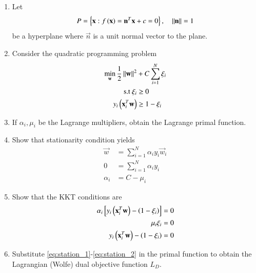 \documentclass[journal,12pt,twocolumn]{IEEEtran}
\renewcommand\thesection{\arabic{section}}
\begin{document}
\begin{enumerate}[label=\thesection.\arabic*,ref=\thesection.\theenumi]
\item Let 
\begin{align}
P = \left\{\mathbf{x}:f\left(\mathbf{x}\right)=\mathbf{n}^T\mathbf{x} +c = 0\right\}, \quad \left\Vert\mathbf{n}\right\Vert = 1
\end{align}
%
be a hyperplane where $\vec{n}$ is a unit normal vector to the plane.
%
\item Consider the quadratic programming problem
%
\begin{align}
\min_{\mathbf{w}}\frac{1}{2}\left\Vert\mathbf{w}\right\Vert^2 &+ C \sum_{i=1}^{N}\xi_i
\\
\text{s.t } \xi_i &\ge 0 
\\ 
y_i\left(\mathbf{x}_i^T\mathbf{w}\right)&\ge1-\xi_i
\end{align}
\item If $\alpha_i, \mu_i$  be the Lagrange multipliers, obtain the Lagrange primal function.
\item  Show that stationarity condition yields
%
\begin{align}
\vec{w} &= \sum_{i=1}^{N}\alpha_iy_i \vec{w}_i
\\
0 &= \sum_{i=1}^{N}\alpha_iy_i 
\\
\alpha_i &= C - \mu_i
\end{align}
\item Show that the KKT conditions are
\begin{align}
\alpha_i {}\left[y_i \left(\mathbf{x}_i^T\mathbf{w}\right)- \left(1-\xi_i\right)\right] &= 0 
\\
\mu_i \xi_i &= 0
\\
y_i \left(\mathbf{x}_i^T\mathbf{w}\right)- \left(1-\xi_i\right) & = 0
\end{align}
\item Substitute \eqref{eq:station_1}-\eqref{eq:station_2} in the primal function to obtain the Lagrangian 
(Wolfe) dual objective function $L_D$.  
\end{enumerate}
	

	
\end{document}

